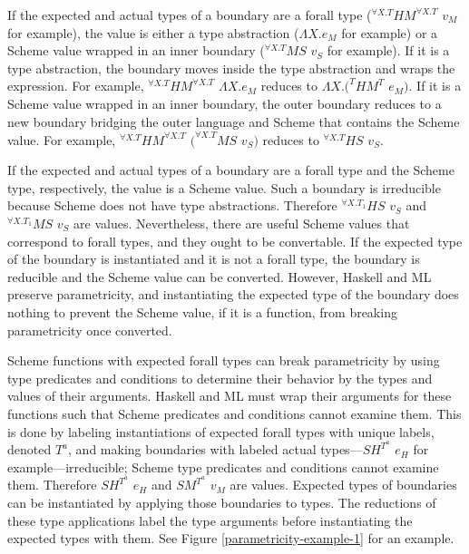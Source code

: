 If the expected and actual types of a boundary are a forall type ($^{\forall X.T}HM^{\forall X.T}$ $v_{M}$ for example), the value is either a type abstraction ($\Lambda X.e_{M}$ for example) or a Scheme value wrapped in an inner boundary ($^{\forall X.T}MS$ $v_{S}$ for example).  If it is a type abstraction, the boundary moves inside the type abstraction and wraps the expression.  For example, $^{\forall X.T}HM^{\forall X.T}$ $\Lambda X.e_{M}$ reduces to $\Lambda X.(^{T}HM^{T}$ $e_{M})$.  If it is a Scheme value wrapped in an inner boundary, the outer boundary reduces to a new boundary bridging the outer language and Scheme that contains the Scheme value.  For example, $^{\forall X.T}HM^{\forall X.T}$ $(^{\forall X.T}MS$ $v_{S})$ reduces to $^{\forall X.T}HS$ $v_{S}$.

If the expected and actual types of a boundary are a forall type and the Scheme type, respectively, the value is a Scheme value.  Such a boundary is irreducible because Scheme does not have type abstractions.  Therefore $^{\forall X.T_{1}}HS$ $v_{S}$ and $^{\forall X.T_{1}}MS$ $v_{S}$ are values.  Nevertheless, there are useful Scheme values that correspond to forall types, and they ought to be convertable.  If the expected type of the boundary is instantiated and it is not a forall type, the boundary is reducible and the Scheme value can be converted.  However, Haskell and ML preserve parametricity, and instantiating the expected type of the boundary does nothing to prevent the Scheme value, if it is a function, from breaking parametricity once converted.

Scheme functions with expected forall types can break parametricity by using type predicates and conditions to determine their behavior by the types and values of their arguments.  Haskell and ML must wrap their arguments for these functions such that Scheme predicates and conditions cannot examine them.  This is done by labeling instantiations of expected forall types with unique labels, denoted $T^{a}$, and making boundaries with labeled actual types---$SH^{T^{a}}$ $e_{H}$ for example---irreducible; Scheme type predicates and conditions cannot examine them.  Therefore $SH^{T^{a}}$ $e_{H}$ and $SM^{T^{a}}$ $v_{M}$ are values.  Expected types of boundaries can be instantiated by applying those boundaries to types.  The reductions of these type applications label the type arguments before instantiating the expected types with them.  See Figure \ref{parametricity-example-1} for an example.



